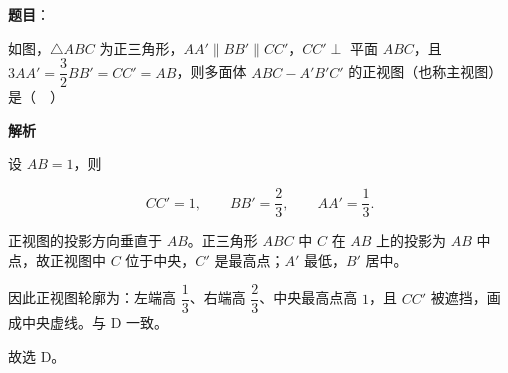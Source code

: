 \begin{answer}

\textbf{题目}：

如图，$\triangle ABC$ 为正三角形，$AA'\parallel BB'\parallel CC'$，$CC'\perp$ 平面 $ABC$，且 $3AA'=\dfrac32BB'=CC'=AB$，则多面体 $ABC-A'B'C'$ 的正视图（也称主视图）是（　）
\nopagebreak[4]
\begin{center}\end{center}
\nopagebreak[4]
\nopagebreak[4]
\begin{center}\end{center}
\nopagebreak[4]
\textbf{解析}

设 $AB=1$，则

\nopagebreak[4]
\[CC'=1,\qquad BB'=\frac23,\qquad AA'=\frac13.\]

正视图的投影方向垂直于 $AB$。正三角形 $ABC$ 中 $C$ 在 $AB$ 上的投影为 $AB$ 中点，故正视图中 $C$ 位于中央，$C'$ 是最高点；$A'$ 最低，$B'$ 居中。

因此正视图轮廓为：左端高 $\dfrac13$、右端高 $\dfrac23$、中央最高点高 $1$，且 $CC'$ 被遮挡，画成中央虚线。与 D 一致。

故选 D。


\end{answer}
